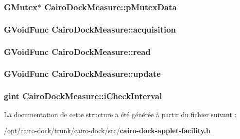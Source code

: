 \subsubsection{\setlength{\rightskip}{0pt plus 5cm}GMutex$\ast$ {\bf CairoDockMeasure::pMutexData}}\label{structCairoDockMeasure_90e5c1a98fd894e117a8b208afbf95db}


\subsubsection{\setlength{\rightskip}{0pt plus 5cm}GVoidFunc {\bf CairoDockMeasure::acquisition}}\label{structCairoDockMeasure_6f2c9df47e005e2cb71742451ecd1e68}


\subsubsection{\setlength{\rightskip}{0pt plus 5cm}GVoidFunc {\bf CairoDockMeasure::read}}\label{structCairoDockMeasure_aa32a18d3004cbe56395b9f31b8de317}


\subsubsection{\setlength{\rightskip}{0pt plus 5cm}GVoidFunc {\bf CairoDockMeasure::update}}\label{structCairoDockMeasure_6bfd9761bf2263a4659bef76ed3bec43}


\subsubsection{\setlength{\rightskip}{0pt plus 5cm}gint {\bf CairoDockMeasure::iCheckInterval}}\label{structCairoDockMeasure_671738bdcda10637faa3e194035d2c26}




La documentation de cette structure a été générée à partir du fichier suivant :\begin{CompactItemize}
\item 
/opt/cairo-dock/trunk/cairo-dock/src/{\bf cairo-dock-applet-facility.h}\end{CompactItemize}
